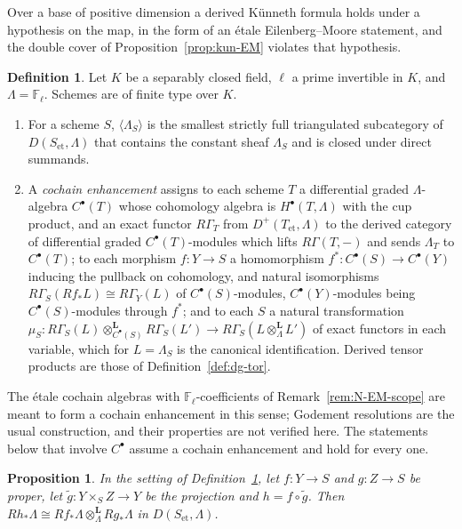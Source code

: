 \documentclass[11pt]{amsart}
\theoremstyle{plain}
\newtheorem{proposition}[theorem]{Proposition}
\theoremstyle{definition}
\newtheorem{definition}[theorem]{Definition}
\theoremstyle{remark}
\numberwithin{equation}{section}
\newcommand{\F}{\mathbb{F}}
\begin{document}
Over a base of positive dimension a derived K\"unneth formula holds
under a hypothesis on the map, in the form of an \'etale
Eilenberg--Moore statement, and the double cover of
Proposition~\ref{prop:kun-EM} violates that hypothesis.

\begin{definition}\label{def:EM-setting}
Let $K$ be a separably closed field, $\ell$ a prime invertible in $K$,
and $\Lambda=\F_\ell$. Schemes are of finite type over $K$.
\begin{enumerate}[label=(\alph*)]
\item For a scheme $S$, $\langle\Lambda_S\rangle$ is the smallest
  strictly full triangulated subcategory of $D(S_{\mathrm{et}},\Lambda)$
  that contains the constant sheaf $\Lambda_S$ and is closed under
  direct summands.
\item A \emph{cochain enhancement} assigns to each scheme $T$ a
  differential graded $\Lambda$-algebra $C^\bullet(T)$ whose cohomology
  algebra is $H^\bullet(T,\Lambda)$ with the cup product, and an exact
  functor $R\Gamma_T$ from $D^+(T_{\mathrm{et}},\Lambda)$ to the derived
  category of differential graded $C^\bullet(T)$-modules which lifts
  $R\Gamma(T,-)$ and sends $\Lambda_T$ to $C^\bullet(T)$; to each
  morphism $f:Y\to S$ a homomorphism $f^*:C^\bullet(S)\to C^\bullet(Y)$
  inducing the pullback on cohomology, and natural isomorphisms
  $R\Gamma_S(Rf_*L)\cong R\Gamma_Y(L)$ of $C^\bullet(S)$-modules,
  $C^\bullet(Y)$-modules being $C^\bullet(S)$-modules through $f^*$; and
  to each $S$ a natural transformation
  $\mu_S:R\Gamma_S(L)\otimes^{\mathbf L}_{C^\bullet(S)}R\Gamma_S(L')\to
  R\Gamma_S(L\otimes^{\mathbf L}_\Lambda L')$ of exact functors in
  each variable, which for $L=\Lambda_S$ is the canonical
  identification. Derived tensor products are those of
  Definition~\ref{def:dg-tor}.
\end{enumerate}
\end{definition}

The \'etale cochain algebras with $\F_\ell$-coefficients of
Remark~\ref{rem:N-EM-scope} are meant to form a cochain enhancement in
this sense; Godement resolutions are the usual construction, and their
properties are not verified here. The statements below that involve
$C^\bullet$ assume a cochain enhancement and hold for every one.

\begin{proposition}\label{prop:EM-fibre}
In the setting of Definition~\ref{def:EM-setting}, let $f:Y\to S$ and
$g:Z\to S$ be proper, let $\tilde g:Y\times_SZ\to Y$ be the projection
and $h=f\circ\tilde g$. Then $Rh_*\Lambda\cong Rf_*\Lambda
\otimes^{\mathbf L}_\Lambda Rg_*\Lambda$ in $D(S_{\mathrm{et}},\Lambda)$.
\end{proposition}
\end{document}
